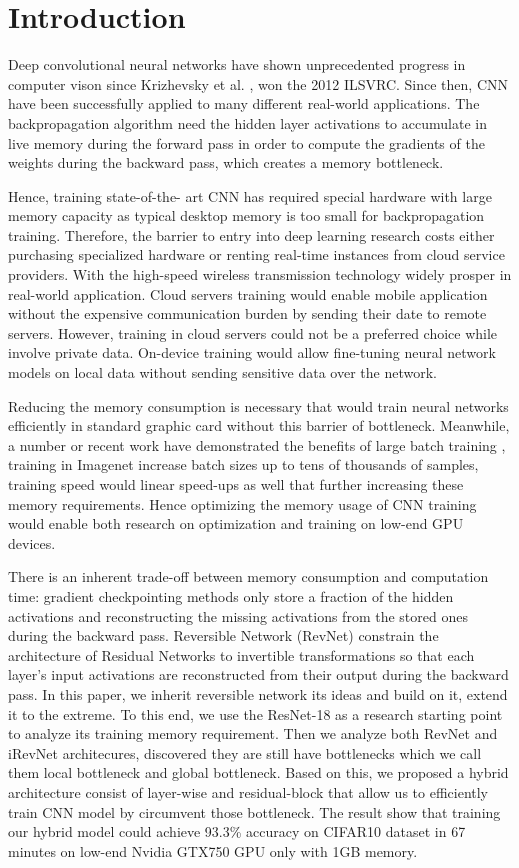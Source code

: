 \documentclass[10pt,twocolumn,letterpaper]{article}
\begin{document}
\section{Introduction}
Deep convolutional neural networks have shown unprecedented progress in computer vison since Krizhevsky et al. \cite{krizhevsky2012imagenet}, won the 2012 ILSVRC. Since then, CNN have been successfully applied to many different real-world applications. The backpropagation algorithm need the hidden layer activations to accumulate in live memory during the forward pass in order to compute the gradients of the weights during the backward pass, which creates a memory bottleneck.

Hence, training state-of-the- art CNN has required special hardware with large memory capacity as typical desktop memory is too small for backpropagation training. Therefore, the barrier to entry into deep learning research costs either  purchasing specialized hardware or renting real-time instances from cloud service providers. With the high-speed wireless transmission technology widely prosper in real-world application. Cloud servers training would enable mobile application without the expensive communication burden by sending their date to remote servers. However, training in cloud servers could not be a preferred choice while involve private data. On-device training would allow fine-tuning neural network models on local data without sending sensitive data over the network.

Reducing the memory consumption is necessary that would train neural networks efficiently in standard graphic card without this barrier of bottleneck. Meanwhile, a number or recent work have demonstrated the benefits of large batch training \cite{largebatch}, training in Imagenet increase batch sizes up to tens of thousands of samples, training speed would linear speed-ups as well that further increasing these memory requirements. Hence optimizing the memory usage of CNN training would enable both research on optimization and training on low-end GPU devices.

  There is an inherent trade-off between memory consumption and computation time: gradient checkpointing methods \cite{chen2016training} only store a fraction of the hidden activations and reconstructing the missing activations from the stored ones during the backward pass. Reversible Network (RevNet) \cite{gomez2017reversible} constrain the architecture of Residual Networks to invertible transformations so that each layer’s input activations are reconstructed from their output during the backward pass. In this paper, we inherit reversible network its ideas and build on it, extend it to the extreme. To this end, we use the ResNet-18 as a research starting point to analyze   its training memory requirement. Then we analyze both RevNet and iRevNet architecures, discovered they are still have bottlenecks which we call them local bottleneck and global bottleneck. Based on this, we proposed a hybrid architecture consist of layer-wise and residual-block that allow us to efficiently train CNN model by circumvent those bottleneck. The result show that training our hybrid model could achieve 93.3\% accuracy on CIFAR10 dataset in 67 minutes on low-end Nvidia GTX750 GPU only with 1GB memory.  
    
\end{document}
